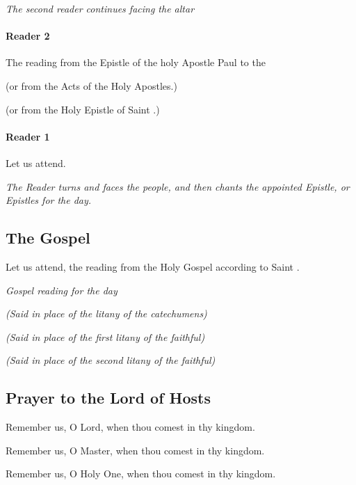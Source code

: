 \documentclass[twoside, letterpaper, 12pt]{report}
\begin{document}
				\emph{The second reader continues facing the altar}

			\paragraph{Reader 2} The reading from the Epistle of the holy Apostle Paul to the \underline{\hspace{1in}}

				(or from the Acts of the Holy Apostles.)

				(or from the Holy Epistle of Saint \underline{\hspace{1cm}}.)

			\paragraph{Reader 1} Let us attend.

				\emph{The Reader turns and faces the people, and then chants the appointed Epistle, or Epistles for the day.}

			\lilyalleluia

		\subsection*{The Gospel}

			\reader Let us attend, the reading from the Holy Gospel according to Saint \underline{\hspace{1in}}.

			\lilyglory

			\reader \emph{Gospel reading for the day}

			\lilyglory

			\reader \lhmThree \emph{(Said in place of the litany of the catechumens)}

				\lhmThree \emph{(Said in place of the first litany of the faithful)}

				\lhmThree \emph{(Said in place of the second litany of the faithful)}

		\subsection*{Prayer to the Lord of Hosts}

				Remember us, O Lord, when thou comest in thy kingdom.\metania

				Remember us, O Master, when thou comest in thy kingdom.\metania

				Remember us, O Holy One, when thou comest in thy kingdom.\metania
\end{document}
